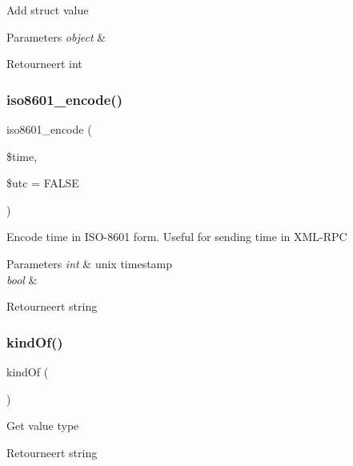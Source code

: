 Add struct value


\begin{DoxyParams}{Parameters}
{\em object} & \\
\hline
\end{DoxyParams}
\begin{DoxyReturn}{Retourneert}
int 
\end{DoxyReturn}
\mbox{\label{class_x_m_l___r_p_c___values_a201f99ae311bb2c53526933576c890d0}} 
\subsubsection{\texorpdfstring{iso8601\_encode()}{iso8601\_encode()}}
{\footnotesize\ttfamily iso8601\+\_\+encode (\begin{DoxyParamCaption}\item[{}]{\$time,  }\item[{}]{\$utc = {\ttfamily FALSE} }\end{DoxyParamCaption})}

Encode time in I\+S\+O-\/8601 form. Useful for sending time in X\+M\+L-\/\+R\+PC


\begin{DoxyParams}{Parameters}
{\em int} & unix timestamp \\
\hline
{\em bool} & \\
\hline
\end{DoxyParams}
\begin{DoxyReturn}{Retourneert}
string 
\end{DoxyReturn}
\mbox{\label{class_x_m_l___r_p_c___values_a3b169c364729cee2afdccadef5229f80}} 
\subsubsection{\texorpdfstring{kindOf()}{kindOf()}}
{\footnotesize\ttfamily kind\+Of (\begin{DoxyParamCaption}{ }\end{DoxyParamCaption})}

Get value type

\begin{DoxyReturn}{Retourneert}
string 
\end{DoxyReturn}
\mbox{\label{class_x_m_l___r_p_c___values_ac9a3751dc2d5479f409d0a4683c37d26}} 
